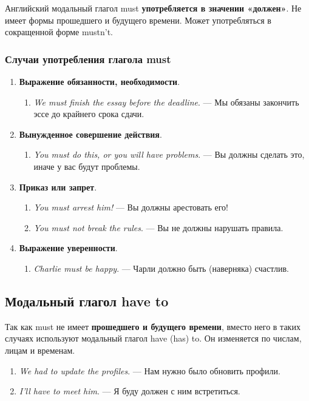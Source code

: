 \documentclass{article}
\begin{document}
Английский модальный глагол must \textbf{употребляется в значении «должен»}. Не имеет формы прошедшего и будущего времени. Может употребляться в сокращенной форме mustn’t. 

\subsubsection{Случаи употребления глагола must}

\begin{enumerate}
	\item \textbf{Выражение обязанности, необходимости}.
	\begin{enumerate}
		\item \emph{We must finish the essay before the deadline}. — Мы обязаны закончить эссе до крайнего срока сдачи. 
	\end{enumerate}
	\item \textbf{Вынужденное совершение действия}.
	\begin{enumerate}
		\item \emph{You must do this, or you will have problems}. — Вы должны сделать это, иначе у вас будут проблемы. 
	\end{enumerate}
	\item \textbf{Приказ или запрет}.
	\begin{enumerate}
		\item \emph{You must arrest him!} — Вы должны арестовать его!
		\item \emph{You must not break the rules}. — Вы не должны нарушать правила. 
	\end{enumerate}
	\item \textbf{Выражение уверенности}.
	\begin{enumerate}
		\item \emph{Charlie must be happy}. — Чарли должно быть (наверняка) счастлив. 
	\end{enumerate}
\end{enumerate}

\subsection{Модальный глагол \textbf{have to}}

Так как must не имеет \textbf{прошедшего и будущего времени}, вместо него в таких случаях используют модальный глагол have (has) to. Он изменяется по числам, лицам и временам. 

\begin{enumerate}
	\item \emph{We had to update the profiles}. — Нам нужно было обновить профили. 
	\item \emph{I’ll have to meet him}. — Я буду должен с ним встретиться. 
\end{enumerate}
\end{document}
